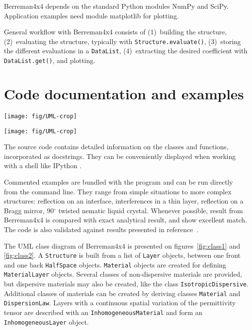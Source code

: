 Berreman4x4 depends on the standard Python modules NumPy\cite{NumPy} and SciPy\cite{SciPy}.
Application examples need module matplotlib\cite{matplotlib} for plotting.

General workflow with Berreman4x4 consists of  
(1)~building the structure, 
(2)~evaluating the structure, typically with \texttt{Structure.evaluate()},
(3)~storing the different evaluations in a \texttt{DataList},
(4)~extracting the desired coefficient with \texttt{DataList.get()}, and plotting.

\section{Code documentation and examples}

\begin{figure*}
\texttt{[image: fig/UML-crop]}
\caption{\label{fig:class1}Class diagram of Berreman4x4: structure, materials, and module functions. }
\end{figure*}

\begin{figure*}
\texttt{[image: fig/UML-crop]}
\caption{\label{fig:class2}Class diagram of Berreman4x4: layers, inhomogeneous materials, and half-spaces.}
\end{figure*}

The source code contains detailed information on the classes and functions, incorporated as docstrings.
They can be conveniently displayed when working with a shell like IPython \cite{IPython}.

Commented examples are bundled with the program and can be run directly from the command line.
They range from simple situations to more complex structures: reflection on an interface, interferences in a thin layer, reflection on a Bragg mirror, 90$^\circ$ twisted nematic liquid crystal.
Whenever possible, result from Berreman4x4 is compared with exact analytical result, and show excellent match.
The code is also validated against results presented in reference~.

The UML class diagram of Berreman4x4 is presented on figures~\ref{fig:class1} and \ref{fig:class2}.
A \texttt{Structure} is built from a list of \texttt{Layer} objects, between one front and one back \texttt{HalfSpace} objects.
\texttt{Material} objects are created for defining \texttt{MaterialLayer} objects.
Several classes of non-dispersive materials are provided, but dispersive materials may also be created, like the class \texttt{IsotropicDispersive}.
Additional classes of materials can be created by deriving classes \texttt{Material} and \texttt{DispersionLaw}.
Layers with a continuous spatial variation of the permittivity tensor are described with an \texttt{InhomogeneousMaterial} and form an \texttt{InhomogeneousLayer} object.


